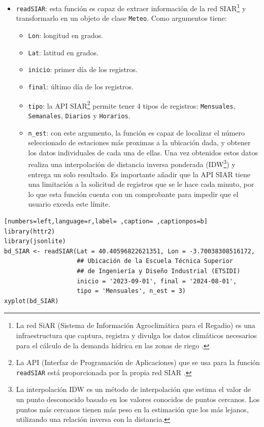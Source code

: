 \begin{itemize}
\item \texttt{readSIAR}: esta función es capaz de extraer información de la red SIAR\footnote{La red SiAR (Sistema de Información Agroclimática para el Regadio) es una infraestructura que captura, registra y divulga los datos climáticos necesarios para el cálculo de la demanda hídrica en las zonas de riego \cite{siar23}.} y transformarlo en un objeto de clase \texttt{Meteo}.
Como argumentos tiene:
\begin{itemize}
\item \texttt{Lon}: longitud en grados.
\item \texttt{Lat}: latitud en grados.
\item \texttt{inicio}: primer día de los registros.
\item \texttt{final}: último día de los registros.
\item \texttt{tipo}: la API SIAR\footnote{La API (Interfaz de Programación de Aplicaciones) que se usa para la función \texttt{readSIAR} está proporcionada por la propia red SIAR \cite{siar23}.} permite tener 4 tipos de registros: \texttt{Mensuales}, \texttt{Semanales}, \texttt{Diarios} y \texttt{Horarios}.
\item \texttt{n\_est}: con este argumento, la función es capaz de localizar el número seleccionado de estaciones más proximas a la ubicación dada, y obtener los datos individuales de cada una de ellas. Una vez obtenidos estos datos realiza una interpolación de distancia inversa ponderada (IDW\footnote{La interpolación IDW es un método de interpolación que estima el valor de un punto desconocido basado en los valores conocidos de puntos cercanos. Los puntos más cercanos tienen más peso en la estimación que los más lejanos, utilizando una relación inversa con la distancia.}) y entrega un solo resultado. Es importante añadir que la API SIAR tiene una limitación a la solicitud de registros que se le hace cada minuto, por lo que esta función cuenta con un comprobante para impedir que el usuario exceda este límite.
\end{itemize}
\end{itemize}
\begin{lstlisting}[numbers=left,language=r,label= ,caption= ,captionpos=b]
library(httr2)
library(jsonlite)
bd_SIAR <- readSIAR(Lat = 40.40596822621351, Lon = -3.70038308516172,
                    ## Ubicación de la Escuela Técnica Superior
                    ## de Ingeniería y Diseño Industrial (ETSIDI)
                    inicio = '2023-09-01', final = '2024-08-01',
                    tipo = 'Mensuales', n_est = 3)
xyplot(bd_SIAR)
\end{lstlisting}

